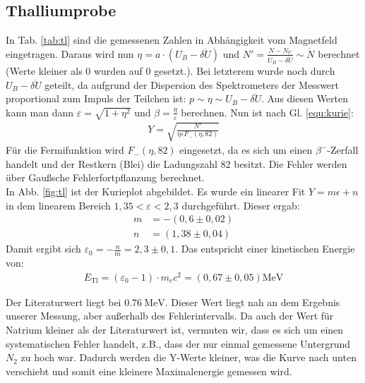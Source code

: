  \newpage

\subsection{Thalliumprobe}
In Tab. \ref{tab:tl} sind die gemessenen Zahlen in Abhängigkeit vom Magnetfeld eingetragen. Daraus wird nun $\eta = a\cdot (U_B - \overline{\delta U})$ und $N' = \frac{N - N_U}{U_B - \overline{\delta U}} \sim \dot{N}$ berechnet (Werte kleiner als 0 wurden auf 0 gesetzt.). Bei letzterem wurde noch durch $U_B - \overline{\delta U}$ geteilt, da aufgrund der Dispersion des Spektrometers der Messwert proportional zum Impuls  der Teilchen ist: $p \sim \eta \sim U_B - \overline{\delta U}$. Aus diesen Werten kann man dann $\varepsilon = \sqrt{1 + \eta^2}$ und $\beta = \frac{\eta}{\varepsilon}$ berechnen. Nun ist nach Gl. \ref{equ:kurie}:
\begin{align*}
Y = \sqrt{\frac{N'}{\eta\varepsilon F_{-}(\eta,82)}}
\end{align*}
Für die Fermifunktion wird $F_{-}(\eta,82)$ eingesetzt, da es sich um einen $\beta^-$-Zerfall handelt und der Restkern (Blei) die Ladungszahl 82 besitzt. Die Fehler werden über Gaußsche Fehlerfortpflanzung berechnet.\\

In Abb. \ref{fig:tl} ist der Kurieplot abgebildet. Es wurde ein linearer Fit $Y = m \epsilon + n$ in dem linearem Bereich $1,35 < \varepsilon < 2,3$ durchgeführt. Dieser ergab:
\begin{align*}
m &= -\si{(0,6\pm 0,02)}\\
n &= \si{(1,38 \pm 0,04)}
\end{align*}
Damit ergibt sich $\varepsilon_0 = -\frac{n}{m} = 2,3 \pm 0,1$. Das entspricht einer kinetischen Energie von:
\begin{align*}
E_\mathrm{Tl} = (\varepsilon_0 - 1)\cdot m_ec^2 = \si{(0,67 \pm 0,05)\mega\eV}
\end{align*}

Der Literaturwert \cite{tlenergy} liegt bei $\SI{0,76}{\mega\eV}$. Dieser Wert liegt nah an dem Ergebnis unserer Messung, aber außerhalb des Fehlerintervalls. Da auch der Wert für Natrium kleiner als der Literaturwert ist, vermuten wir, dass es sich um einen systematischen Fehler handelt, z.B., dass der nur einmal gemessene Untergrund $N_2$ zu hoch war. Dadurch werden die Y-Werte kleiner, was die Kurve nach unten verschiebt und somit eine kleinere Maximalenergie gemessen wird.  

